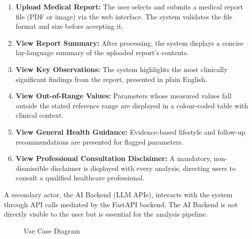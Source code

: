\documentclass[12pt,a4paper]{report}
\begin{document}
\begin{enumerate}
    \item \textbf{Upload Medical Report:} The user selects and submits a medical report file (PDF or image) via the web interface. The system validates the file format and size before accepting it.
    \item \textbf{View Report Summary:} After processing, the system displays a concise lay-language summary of the uploaded report's contents.
    \item \textbf{View Key Observations:} The system highlights the most clinically significant findings from the report, presented in plain English.
    \item \textbf{View Out-of-Range Values:} Parameters whose measured values fall outside the stated reference range are displayed in a colour-coded table with clinical context.
    \item \textbf{View General Health Guidance:} Evidence-based lifestyle and follow-up recommendations are presented for flagged parameters.
    \item \textbf{View Professional Consultation Disclaimer:} A mandatory, non-dismissible disclaimer is displayed with every analysis, directing users to consult a qualified healthcare professional.
\end{enumerate}

A secondary actor, the AI Backend (LLM APIs), interacts with the system through API calls mediated by the FastAPI backend. The AI Backend is not directly visible to the user but is essential for the analysis pipeline.

\begin{figure}[h]
    \centering
    \caption{Use Case Diagram}
\end{figure}
\end{document}
